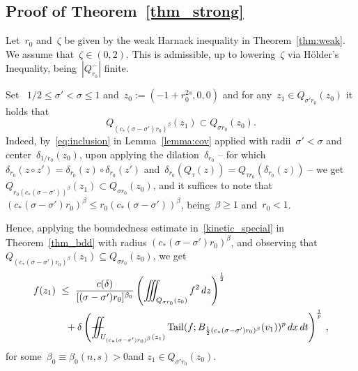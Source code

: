 \documentclass[leqno,10pt]{amsart}
\theoremstyle{plain}
\theoremstyle{remark}
\numberwithin{equation}{section}
\DeclareMathOperator*{\tail}{{\rm Tail}}
\def\dx{\,{\rm d}x}
\def\dt{\,{\rm d}t}
\def \d{\,{\rm d}}
\def\Xiint#1{\mathchoice
    {\XXiint\displaystyle\textstyle{#1}}%
    {\XXiint\textstyle\scriptstyle{#1}}%
    {\XXiint\scriptstyle\scriptscriptstyle{#1}}%
    {\XXiint\scriptscriptstyle\scriptscriptstyle{#1}}%
    \!\iint}
\def\XXiint#1#2#3{\setbox0=\hbox{$#1{#2#3}{\iint}$}
    \vcenter{\hbox{$#2#3$}}\kern-0.5\wd0}
\def\biint{\Xiint{-\!-}}
\begin{document}
{ \subsection{Proof of Theorem~\ref{thm_strong}}\label{sec_proof-strong} 
  Let~$r_{0}$ and~$\zeta$ be given by the weak Harnack inequality in Theorem~\ref{thm:weak}. 
 We assume that~$\zeta \in (0,2)$. This is admissible, up to lowering~$\zeta$ via H\"older's Inequality, being~$|Q^-_{r_{0}}|$ finite.
  
  Set ~$1/2 \leq  \sigma' < \sigma \leq 1$ and~$z_{0}:=(-1+r_{0}^{2s},0,0)$ and for any~$z_1 \in {Q}_{\sigma'r_{0}}(z_{0})$ it holds that
  \[
  {Q}_{(c_*(\sigma-\sigma')r_{0})^\beta}(z_1) \subset {Q}_{\sigma r_{0}}(z_{0}).
  \]
   Indeed, by~\eqref{eq:inclusion} in Lemma~\ref{lemma:cov} applied with radii~$\sigma' < \sigma$ and center~$\delta_{1/r_{0}}(z_{0})$, upon applying the dilation~$\delta_{r_{0}}$ -- for which~$\delta_{r_{0}}(z\circ z')=\delta_{r_{0}}(z)\circ\delta_{r_{0}}(z')$ and~$\delta_{r_{0}}({Q}_{\tau}(z))={Q}_{\tau r_{0}}(\delta_{r_{0}}(z))$ -- we get~${Q}_{r_{0}(c_*(\sigma-\sigma'))^\beta}(z_1) \subset {Q}_{\sigma r_{0}}(z_{0})$, and it suffices to note that~$(c_*(\sigma-\sigma')r_{0})^\beta \leq r_{0}(c_*(\sigma-\sigma'))^\beta$, being~$\beta\geq1$ and~$r_{0}<1$.
  
   Hence, applying the boundedness estimate in~\eqref{kinetic_special} in Theorem~\ref{thm_bdd} 
   with radius $(c_*(\sigma-\sigma')r_{0})^\beta$, and observing that 
   ${Q}_{(c_*(\sigma-\sigma')r_{0})^\beta}(z_1) \subseteq {Q}_{\sigma r_{0}}(z_{0})$, we get
  \begin{equation}\label{eq:bdd-ref-1} 
  \begin{aligned}
  	f(z_1)   & \ \leq \  \frac{c(\delta)}{[(\sigma-\sigma')r_{0}]^{\beta_{0}}}\left(\iiint_{{Q}_{\sigma r_{0}}(z_{0})}f^2 \d z\right)^\frac{1}{2}\\
	& \quad +
  	\delta\left(\biint_{{U}_{(c_*(\sigma-\sigma')r_{0})^\beta}(z_1)}\tail(f;B_{\frac{1}{2}(c_*(\sigma-\sigma')r_{0})^\beta}(v_1))^{p} \dx\dt\right)^\frac{1}{p}\,,
    \end{aligned}
  \end{equation}
  for some~$\beta_{0} \equiv \beta_{0}(n,s)>0$and $z_1 \in {Q}_{\sigma'r_{0}}(z_{0})$. 
  
}
\end{document}
